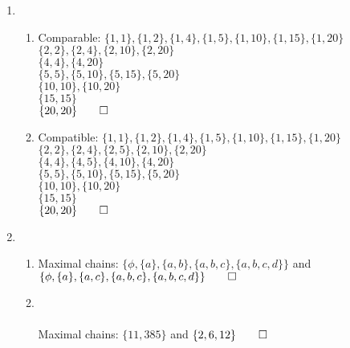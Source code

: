 \documentclass[12pt, a4paper]{article}
\begin{document}
\begin{enumerate}[Q\arabic*.]
  \item 
    \begin{enumerate}[(\alph*)]
      \item Comparable: $\{1, 1\}, \{1, 2\}, \{1, 4\}, \{1, 5\}, \{1, 10\}, \{1, 15\}, \{1, 20\}$\\
        $\{2, 2\}, \{2, 4\}, \{2, 10\}, \{2, 20\}$\\ 
        $\{4, 4\}, \{4, 20\}$\\ 
        $\{5, 5\}, \{5, 10\}, \{5, 15\}, \{5, 20\}$\\
        $\{10, 10\}, \{10, 20\}$\\
        $\{15, 15\}$\\
        $\{20, 20\} \qed$
      \item Compatible: $\{1, 1\}, \{1, 2\}, \{1, 4\}, \{1, 5\}, \{1, 10\}, \{1, 15\}, \{1, 20\}$\\
        $\{2, 2\}, \{2, 4\}, \{2, 5\}, \{2, 10\}, \{2, 20\}$\\
        $\{4, 4\}, \{4, 5\}, \{4, 10\}, \{4, 20\}$\\
        $\{5, 5\}, \{5, 10\}, \{5, 15\}, \{5, 20\}$\\
        $\{10, 10\}, \{10, 20\}$\\
        $\{15, 15\}$\\
        $\{20, 20\} \qed$
    \end{enumerate}
  \pagebreak

\item 
  \begin{enumerate}[(\alph*)]
    \item Maximal chains: $\{\phi, \{a\}, \{a, b\}, \{a, b, c\}, \{a, b, c, d\}\}$ and $\{\phi, \{a\}, \{a, c\}, \{a, b, c\}, \{a, b, c, d\}\} \qed$
    \item \quad\\
      \\
Maximal chains: $\{11, 385\}$ and $\{2, 6, 12\} \qed$
  \end{enumerate}


\end{enumerate}
\end{document}
